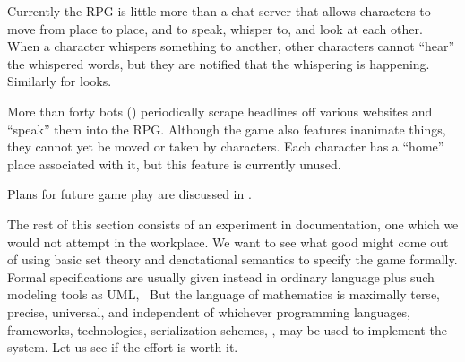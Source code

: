 Currently the RPG is little more than a chat server that allows
characters to move from place to place, and to speak, whisper to, and
look at each other.
When a character whispers something to another, other characters
cannot ``hear'' the whispered words, but they are notified that the
whispering is happening.
Similarly for looks.

More than forty bots () periodically scrape
headlines off various websites and ``speak'' them into the RPG\@.
Although the game also features inanimate things, they cannot yet be
moved or taken by characters.
Each character has a ``home'' place associated with it, but this
feature is currently unused.

Plans for future game play are discussed in .

The rest of this section consists of an experiment in documentation,
one which we would not attempt in the workplace. We want to see what
good might come out of using basic set theory and denotational
semantics to specify the game formally. Formal specifications are
usually given instead in ordinary language plus such modeling tools as
UML, \etc\ But the language of mathematics is maximally terse,
precise, universal, and independent of whichever programming
languages, frameworks, technologies, serialization schemes, \etc, may
be used to implement the system. Let us see if the effort is worth it.
